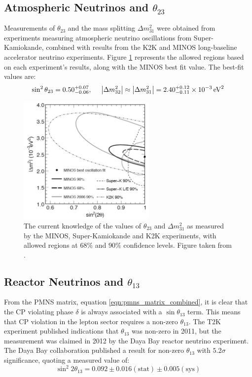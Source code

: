 \subsection{Atmospheric Neutrinos and $\theta_{23}$}
Measurements of $\theta_{23}$ and the mass splitting $\Delta m^2_{31}$ were obtained from experiments measuring atmospheric neutrino oscillations from Super-Kamiokande\citep{SuperK2006}, combined with results from the K2K\citep{K2K2006} and MINOS\citep{MINOS2008} long-baseline accelerator neutrino experiments. Figure \ref{fig:theta_23_confidence} represents the allowed regions based on each experiment's results, along with the MINOS best fit value. The best-fit values are\citep{Mezzetto2010}:
\begin{equation}\label{eqn:atmospheric_parameters}
\sin^2 \theta_{23} = 0.50^{+0.07}_{-0.06}, ~~~~\left|\Delta m^2_{32} \right| \approx \left| \Delta m^2_{31} \right| = 2.40^{+0.12}_{-0.11} \times 10^{-3} \,\mathrm{eV}^2
\end{equation}

\begin{figure}
\centering
\includegraphics[width=0.6\textwidth]{chapters/neutrinophysics_images/theta_23}
\caption[Allowed region for $\theta_{23}$ and $\Delta m^2_{31}$]{\label{fig:theta_23_confidence}The current knowledge of the values of $\theta_{23}$ and $\Delta m^2_{31}$ as measured by the MINOS, Super-Kamiokande and K2K experiments, with allowed regions at $68\%$ and $90\%$ confidence levels. Figure taken from \citep{PDG2011}.}
\end{figure}

\subsection{Reactor Neutrinos and $\theta_{13}$}
From the PMNS matrix, equation \eqref{eqn:pmns_matrix_combined}, it is clear that the CP violating phase $\delta$ is always associated with a $\sin\theta_{13}$ term. This means that CP violation in the lepton sector requires a non-zero $\theta_{13}$. The T2K\citep{Abe2011} experiment published indications that $\theta_{13}$ was non-zero in 2011, but the measurement was claimed in 2012 by the Daya Bay reactor neutrino experiment. The Daya Bay collaboration published a result for non-zero $\theta_{13}$ with $5.2\sigma$ significance\citep{An2012}, quoting a measured value of:
\begin{equation}\label{eqn:reactor_parameters_dyb}
\sin^2 2\theta_{13} = 0.092 \pm 0.016 (\mathrm{stat}) \pm 0.005 (\mathrm{sys})
\end{equation}

